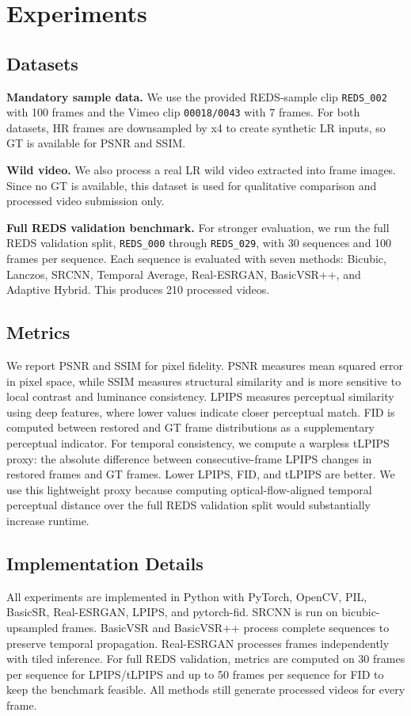 \section{Experiments}
\label{sec:experiments}
\subsection{Datasets}
\textbf{Mandatory sample data.}
We use the provided REDS-sample clip \texttt{REDS\_002} with 100 frames and the Vimeo clip \texttt{00018/0043} with 7 frames. For both datasets, HR frames are downsampled by x4 to create synthetic LR inputs, so GT is available for PSNR and SSIM.

\textbf{Wild video.}
We also process a real LR wild video extracted into frame images. Since no GT is available, this dataset is used for qualitative comparison and processed video submission only.

\textbf{Full REDS validation benchmark.}
For stronger evaluation, we run the full REDS validation split, \texttt{REDS\_000} through \texttt{REDS\_029}, with 30 sequences and 100 frames per sequence. Each sequence is evaluated with seven methods: Bicubic, Lanczos, SRCNN, Temporal Average, Real-ESRGAN, BasicVSR++, and Adaptive Hybrid. This produces 210 processed videos.

\subsection{Metrics}
We report PSNR and SSIM for pixel fidelity. PSNR measures mean squared error in pixel space, while SSIM measures structural similarity and is more sensitive to local contrast and luminance consistency. LPIPS measures perceptual similarity using deep features, where lower values indicate closer perceptual match. FID is computed between restored and GT frame distributions as a supplementary perceptual indicator. For temporal consistency, we compute a warpless tLPIPS proxy: the absolute difference between consecutive-frame LPIPS changes in restored frames and GT frames. Lower LPIPS, FID, and tLPIPS are better. We use this lightweight proxy because computing optical-flow-aligned temporal perceptual distance over the full REDS validation split would substantially increase runtime.

\subsection{Implementation Details}
All experiments are implemented in Python with PyTorch, OpenCV, PIL, BasicSR, Real-ESRGAN, LPIPS, and pytorch-fid. SRCNN is run on bicubic-upsampled frames. BasicVSR and BasicVSR++ process complete sequences to preserve temporal propagation. Real-ESRGAN processes frames independently with tiled inference. For full REDS validation, metrics are computed on 30 frames per sequence for LPIPS/tLPIPS and up to 50 frames per sequence for FID to keep the benchmark feasible. All methods still generate processed videos for every frame.


